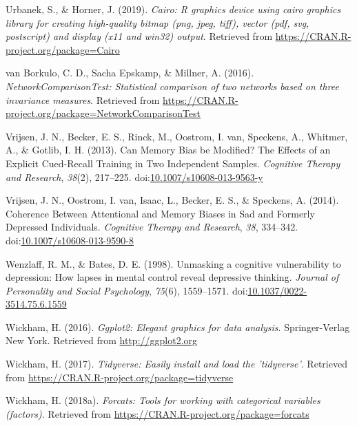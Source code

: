 \documentclass[man,floatsintext]{apa6}
\begin{document}
\leavevmode\hypertarget{ref-R-Cairo}{}%
Urbanek, S., \& Horner, J. (2019). \emph{Cairo: R graphics device using cairo graphics library for creating high-quality bitmap (png, jpeg, tiff), vector (pdf, svg, postscript) and display (x11 and win32) output}. Retrieved from \url{https://CRAN.R-project.org/package=Cairo}

\leavevmode\hypertarget{ref-R-NetworkComparisonTest}{}%
van Borkulo, C. D., Sacha Epskamp, \& Millner, A. (2016). \emph{NetworkComparisonTest: Statistical comparison of two networks based on three invariance measures}. Retrieved from \url{https://CRAN.R-project.org/package=NetworkComparisonTest}

\leavevmode\hypertarget{ref-Vrijsen2013}{}%
Vrijsen, J. N., Becker, E. S., Rinck, M., Oostrom, I. van, Speckens, A., Whitmer, A., \& Gotlib, I. H. (2013). Can Memory Bias be Modified? The Effects of an Explicit Cued-Recall Training in Two Independent Samples. \emph{Cognitive Therapy and Research}, \emph{38}(2), 217--225. doi:\href{https://doi.org/10.1007/s10608-013-9563-y}{10.1007/s10608-013-9563-y}

\leavevmode\hypertarget{ref-Vrijsen2014}{}%
Vrijsen, J. N., Oostrom, I. van, Isaac, L., Becker, E. S., \& Speckens, A. (2014). Coherence Between Attentional and Memory Biases in Sad and Formerly Depressed Individuals. \emph{Cognitive Therapy and Research}, \emph{38}, 334--342. doi:\href{https://doi.org/10.1007/s10608-013-9590-8}{10.1007/s10608-013-9590-8}

\leavevmode\hypertarget{ref-Wenzlaff1998}{}%
Wenzlaff, R. M., \& Bates, D. E. (1998). Unmasking a cognitive vulnerability to depression: How lapses in mental control reveal depressive thinking. \emph{Journal of Personality and Social Psychology}, \emph{75}(6), 1559--1571. doi:\href{https://doi.org/10.1037/0022-3514.75.6.1559}{10.1037/0022-3514.75.6.1559}

\leavevmode\hypertarget{ref-R-ggplot2}{}%
Wickham, H. (2016). \emph{Ggplot2: Elegant graphics for data analysis}. Springer-Verlag New York. Retrieved from \url{http://ggplot2.org}

\leavevmode\hypertarget{ref-R-tidyverse}{}%
Wickham, H. (2017). \emph{Tidyverse: Easily install and load the 'tidyverse'}. Retrieved from \url{https://CRAN.R-project.org/package=tidyverse}

\leavevmode\hypertarget{ref-R-forcats}{}%
Wickham, H. (2018a). \emph{Forcats: Tools for working with categorical variables (factors)}. Retrieved from \url{https://CRAN.R-project.org/package=forcats}
\end{document}

